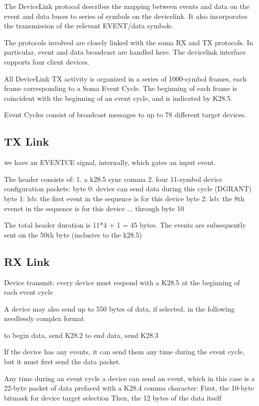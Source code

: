 
The DeviceLink protocol describes the mapping between events and
data on the event and data buses to series of symbols on the
devicelink. It also incorporates the transmission of the relevant
EVENT/data symbols.

The protocols involved are closely linked with the soma RX and TX
protocols. In particular, event and data broadcast are handled
here. The devicelink interface supports four client devices.

All DeviceLink TX activity is organized in a series of 1000-symbol
frames, each frame corresponding to a Soma Event Cycle. The beginning
of each frame is coincident with the beginning of an event cycle, and
is indicated by K28.5.

Event Cycles consist of broadcast messages to up to 78 different
target devices. 


\subsection{TX Link} 

we have an EVENTCE signal, internally, which gates an input event. 

The header consists of:
1. a k28.5 sync comma
2. four 11-symbol device configuration packets:
byte 0: device can send data during this cycle (DGRANT)
byte 1: lsb: the first event in the sequence is for this device
byte 2: lsb: the 8th evenet in the sequence is for this device
... through byte 10

The total header duration is 11*4 + 1 = 45 bytes. The events are
subsequently sent on the 50th byte (inclusive to the k28.5)

\subsection{RX Link}

Device transmit:
every device must respond with a K28.5 at the beginning of each event cycle

A device may also send up to 550 bytes of data, if selected, in the following needlessly complex format

to begin data, send K28.2
to end data, send K28.3

If the device has any events, it can send them any time during the event cycle, but it must first send the data packet. 


Any time during an event cycle a device can send an event, which in
this case is a 22-byte packet of data prefaced with a K28.4 comma
character:
  First, the 10-byte bitmask for device target selection
  Then, the 12 bytes of the data itself



